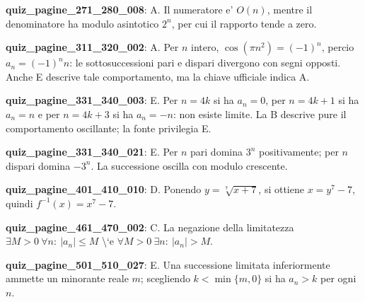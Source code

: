 \documentclass[11pt,a4paper]{article}
\newcounter{quiz}
\begin{document}
\noindent\textbf{quiz\_pagine\_271\_280\_008}: A. Il numeratore e' $O(n)$, mentre il denominatore ha modulo asintotico $2^n$, per cui il rapporto tende a zero.\par\medskip
\noindent\textbf{quiz\_pagine\_311\_320\_002}: A. Per $n$ intero, $\cos(\pi n^2)=(-1)^n$, percio $a_n=(-1)^n n$: le sottosuccessioni pari e dispari divergono con segni opposti. Anche E descrive tale comportamento, ma la chiave ufficiale indica A.\par\medskip
\noindent\textbf{quiz\_pagine\_331\_340\_003}: E. Per $n=4k$ si ha $a_n=0$, per $n=4k+1$ si ha $a_n=n$ e per $n=4k+3$ si ha $a_n=-n$: non esiste limite. La B descrive pure il comportamento oscillante; la fonte privilegia E.\par\medskip
\noindent\textbf{quiz\_pagine\_331\_340\_021}: E. Per $n$ pari domina $3^n$ positivamente; per $n$ dispari domina $-3^n$. La successione oscilla con modulo crescente.\par\medskip
\noindent\textbf{quiz\_pagine\_401\_410\_010}: D. Ponendo $y=\sqrt[7]{x+7}$, si ottiene $x=y^7-7$, quindi $f^{-1}(x)=x^7-7$.\par\medskip
\noindent\textbf{quiz\_pagine\_461\_470\_002}: C. La negazione della limitatezza $\exists M>0\ \forall n:\ |a_n|\le M$ \textbackslash{}`e $\forall M>0\ \exists n:\ |a_n|>M$.\par\medskip
\noindent\textbf{quiz\_pagine\_501\_510\_027}: E. Una successione limitata inferiormente ammette un minorante reale $m$; scegliendo $k<\min\{m,0\}$ si ha $a_n>k$ per ogni $n$.\par\medskip
\end{document}
